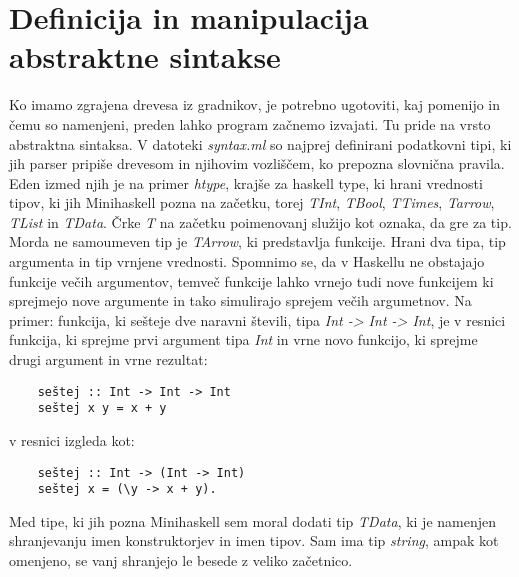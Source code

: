 \documentclass[12pt,a4paper,openany]{book}
\begin{document}
\section{Definicija in manipulacija abstraktne sintakse}
Ko imamo zgrajena drevesa iz gradnikov, je potrebno ugotoviti, kaj pomenijo in čemu so namenjeni, preden lahko program začnemo izvajati. Tu pride na vrsto abstraktna sintaksa. 
V datoteki \emph{syntax.ml} so najprej definirani podatkovni tipi, ki jih parser pripiše drevesom in njihovim vozliščem, ko prepozna slovnična pravila. Eden izmed njih je na primer 
\emph{htype}, krajše za haskell type, ki hrani vrednosti tipov, ki jih Minihaskell pozna na začetku, torej \emph{TInt}, \emph{TBool}, \emph{TTimes}, \emph{Tarrow}, \emph{TList} in 
\emph{TData}. Črke \emph{T} na začetku poimenovanj služijo kot oznaka, da gre za tip. Morda ne samoumeven tip je \emph{TArrow}, ki predstavlja funkcije. Hrani dva tipa, tip argumenta
in tip vrnjene vrednosti. Spomnimo se, da v Haskellu ne obstajajo funkcije večih argumentov, temveč funkcije lahko vrnejo tudi nove funkcijem ki sprejmejo nove argumente in tako 
simulirajo sprejem večih argumetnov. Na primer: funkcija, ki sešteje dve naravni števili, tipa \emph{Int -> Int -> Int}, je v resnici funkcija, ki sprejme prvi argument tipa \emph{Int}
in vrne novo funkcijo, ki sprejme drugi argument in vrne rezultat:
\begin{lstlisting}
	seštej :: Int -> Int -> Int
	seštej x y = x + y
\end{lstlisting}
v resnici izgleda kot:
\begin{lstlisting}
	seštej :: Int -> (Int -> Int)
	seštej x = (\y -> x + y).
\end{lstlisting}
Med tipe, ki jih pozna Minihaskell sem moral dodati tip \emph{TData}, ki je namenjen shranjevanju imen konstruktorjev in imen tipov. Sam ima tip \emph{string}, ampak kot omenjeno, 
se vanj shranjejo le besede z veliko začetnico. 
\end{document}
